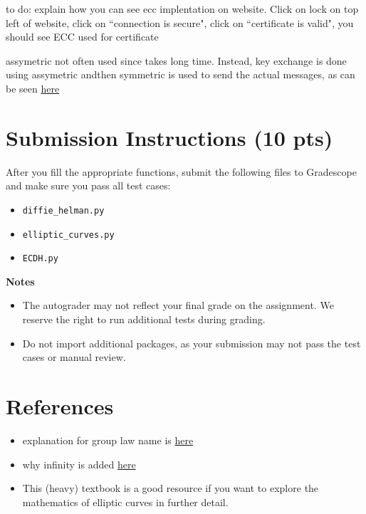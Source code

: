 \documentclass{article}
\begin{document}
    to do: explain how you can see ecc implentation on website. Click on lock on top left of website, click on ``connection is secure", click on ``certificate is valid", you should see ECC used for certificate

    
    assymetric not often used since takes long time. Instead, key exchange is done using assymetric andthen symmetric is used to send the actual messages, as can be seen \href{https://github.com/nakov/Practical-Cryptography-for-Developers-Book/blob/master/asymmetric-key-ciphers/ecc-encryption-decryption.md}{here}


\section*{Submission Instructions (10 pts)}
    After you fill the appropriate functions, submit the following files to Gradescope and make sure you pass all test cases:
    \begin{itemize}
        \item \lstinline{diffie_helman.py}
        \item \lstinline{elliptic_curves.py}
        \item \lstinline{ECDH.py}
    \end{itemize}

    \vspace{3mm}
    \textbf{Notes}
    \begin{itemize}
        \item The autograder may not reflect your final grade on the assignment. We reserve the right to run additional tests during grading.
        \item Do not import additional packages, as your submission may not pass the test cases or manual review.
    \end{itemize}

    

\section*{References}

\begin{itemize}
    \item explanation for group law name is \href{https://www.math.brown.edu/reschwar/M1540B/elliptic.pdf}{here}
    \item why infinity is added \href{https://crypto.stackexchange.com/questions/70507/in-elliptic-curve-what-does-the-point-at-infinity-look-like}{here}
    \item This (heavy) textbook is a good resource if you want to explore the mathematics of elliptic curves in further detail.
\end{itemize}
\end{document}
